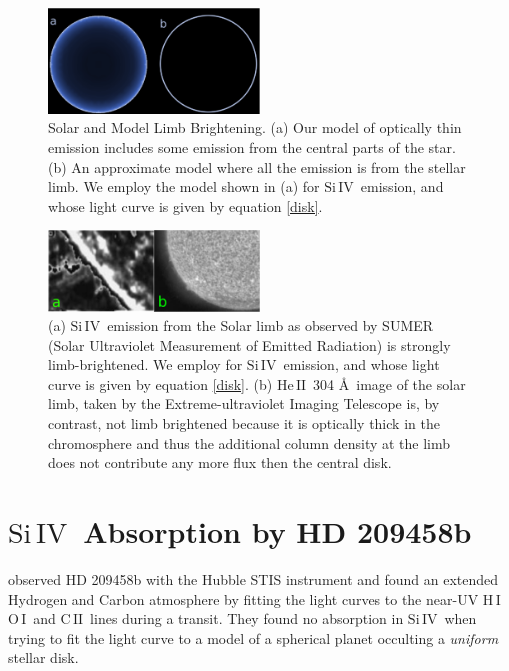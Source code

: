 \documentclass[manuscript]{aastex}
\newcommand{\cii}{\ensuremath{\mathrm{C}\,\scriptstyle \mathrm{II}}}
\newcommand{\oi}{\ensuremath{\mathrm{O}\,\scriptstyle \mathrm{I}}}
\newcommand{\hi}{\ensuremath{\mathrm{H}\,\scriptstyle \mathrm{I}}}
\newcommand{\heII}{\ensuremath{\mathrm{He}\,\scriptstyle \mathrm{II}}}
\newcommand{\siIV}{\ensuremath{\mathrm{Si}\,\scriptstyle \mathrm{IV}}}
\begin{document}
\begin{figure}
\begin{center}
\includegraphics[width=0.5\textwidth]{model_comparison.eps}
\caption{Solar and Model Limb Brightening. (a) Our model of optically thin emission includes some emission from the central parts of the star. (b) An approximate model where all the emission is from the stellar limb. We employ the model shown in (a) for \siIV\ emission, and whose light curve is given by  equation \ref{disk}.}
\label{limbmodel}
\end{center}
\end{figure}

\begin{figure}
\begin{center}
\includegraphics[width=0.5\textwidth]{limb_compare_siIV_heII.eps}
\caption{(a) \siIV\ emission from the Solar limb as observed by SUMER (Solar Ultraviolet Measurement of Emitted Radiation) \citep{wiik} is strongly limb-brightened. We employ for \siIV\ emission, and whose light curve is given by  equation \ref{disk}. (b) \heII\ 304 \AA\ image of the solar limb, taken by the Extreme-ultraviolet Imaging Telescope \citep{feldman} is, by contrast, not limb brightened because it is optically thick in the chromosphere and thus the additional column density at the limb does not contribute any more flux then the central disk.}
\label{limbs}
\end{center}
\end{figure}

\section{\siIV\ Absorption by HD 209458b} \label{osiris}

\citet{viddisc} observed HD 209458b with the Hubble STIS instrument and found
an extended Hydrogen and Carbon atmosphere by fitting the light curves
to the near-UV \hi\, \oi\ and \cii\ lines during a transit. They found no absorption in \siIV\ when trying to fit the light curve to a model of a spherical planet occulting a {\it uniform} stellar disk.
\end{document}
